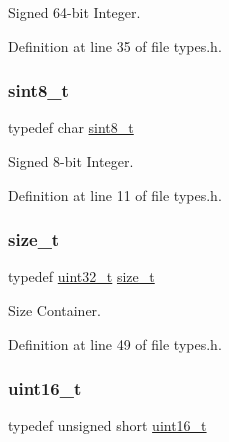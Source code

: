 Signed 64-\/bit Integer. 



Definition at line 35 of file types.\+h.

\mbox{\label{a00047_afa23178c4119f09bd4562a86b501f444_afa23178c4119f09bd4562a86b501f444}} 
\subsubsection{\texorpdfstring{sint8\+\_\+t}{sint8\_t}}
{\footnotesize\ttfamily typedef char \hyperlink{a00047_afa23178c4119f09bd4562a86b501f444_afa23178c4119f09bd4562a86b501f444}{sint8\+\_\+t}}



Signed 8-\/bit Integer. 



Definition at line 11 of file types.\+h.

\mbox{\label{a00047_a29d85914ddff32967d85ada69854206d_a29d85914ddff32967d85ada69854206d}} 
\subsubsection{\texorpdfstring{size\+\_\+t}{size\_t}}
{\footnotesize\ttfamily typedef \hyperlink{a00047_a435d1572bf3f880d55459d9805097f62_a435d1572bf3f880d55459d9805097f62}{uint32\+\_\+t} \hyperlink{a00047_a29d85914ddff32967d85ada69854206d_a29d85914ddff32967d85ada69854206d}{size\+\_\+t}}



Size Container. 



Definition at line 49 of file types.\+h.

\mbox{\label{a00047_a273cf69d639a59973b6019625df33e30_a273cf69d639a59973b6019625df33e30}} 
\subsubsection{\texorpdfstring{uint16\+\_\+t}{uint16\_t}}
{\footnotesize\ttfamily typedef unsigned short \hyperlink{a00047_a273cf69d639a59973b6019625df33e30_a273cf69d639a59973b6019625df33e30}{uint16\+\_\+t}}




